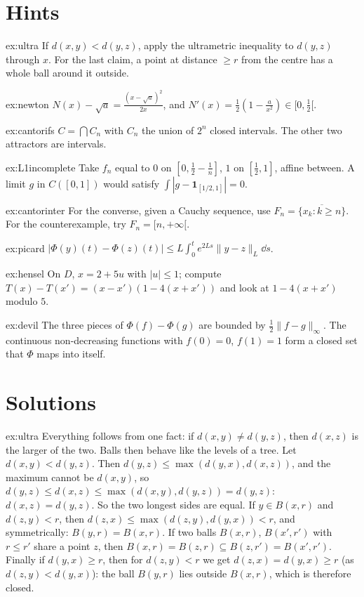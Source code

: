 \section{Hints}

\begin{hint}{ex:ultra}
If $d(x,y)<d(y,z)$, apply the ultrametric inequality to $d(y,z)$ through $x$. For the last claim, a point at distance $\ge r$ from the centre
has a whole ball around it outside.
\end{hint}
\begin{hint}{ex:newton}
$N(x)-\sqrt a=\frac{(x-\sqrt a)^2}{2x}$, and $N'(x)=\frac12(1-\frac a{x^2})\in[0,\frac12[$.
\end{hint}
\begin{hint}{ex:cantorifs}
$C=\bigcap C_n$ with $C_n$ the union of $2^n$ closed intervals. The other two attractors are intervals.
\end{hint}
\begin{hint}{ex:L1incomplete}
Take $f_n$ equal to $0$ on $[0,\frac12-\frac1n]$, $1$ on $[\frac12,1]$, affine between. A limit $g$ in $C([0,1])$ would satisfy $\int|g-\mathbf 1_{[1/2,1]}|=0$.
\end{hint}
\begin{hint}{ex:cantorinter}
For the converse, given a Cauchy sequence, use $F_n=\overline{\{x_k:k\ge n\}}$. For the counterexample, try $F_n=[n,+\infty[$.
\end{hint}
\begin{hint}{ex:picard}
$|\Phi(y)(t)-\Phi(z)(t)|\le L\int_0^te^{2Ls}\|y-z\|_L\dd s$.
\end{hint}
\begin{hint}{ex:hensel}
On $D$, $x=2+5u$ with $|u|\le1$; compute $T(x)-T(x')=(x-x')(1-4(x+x'))$ and look at $1-4(x+x')$ modulo $5$.
\end{hint}
\begin{hint}{ex:devil}
The three pieces of $\Phi(f)-\Phi(g)$ are bounded by $\frac12\|f-g\|_\infty$. The continuous non-decreasing functions with $f(0)=0$, $f(1)=1$ form a closed set that
$\Phi$ maps into itself.
\end{hint}

\section{Solutions}

\begin{solution}{ex:ultra}
\idea Everything follows from one fact: if $d(x,y)\ne d(y,z)$, then $d(x,z)$ is the larger of the two. Balls then behave like the levels of a
tree.
\writeup Let $d(x,y)<d(y,z)$. Then $d(y,z)\le\max(d(y,x),d(x,z))$, and the maximum cannot be $d(x,y)$, so $d(y,z)\le d(x,z)\le\max(d(x,y),d(y,z))=d(y,z)$:
$d(x,z)=d(y,z)$. So the two longest sides are equal. If $y\in B(x,r)$ and $d(z,y)<r$, then $d(z,x)\le\max(d(z,y),d(y,x))<r$, and symmetrically: $B(y,r)=B(x,r)$.
If two balls $B(x,r)$, $B(x',r')$ with $r\le r'$ share a point $z$, then $B(x,r)=B(z,r)\subseteq B(z,r')=B(x',r')$. Finally if $d(y,x)\ge r$, then for
$d(z,y)<r$ we get $d(z,x)=d(y,x)\ge r$ (as $d(z,y)<d(y,x)$): the ball $B(y,r)$ lies outside $B(x,r)$, which is therefore closed.
\end{solution}

